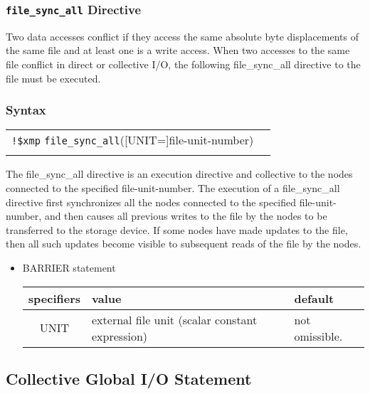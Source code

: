    \subsubsection{{\tt file\_sync\_all} Directive}
   Two data accesses conflict if they access the same absolute byte displacements of the same file and at least one is a write access.
   When two accesses to the same file conflict in direct or collective I/O,
   the following file\_sync\_all directive to the file must be executed.

   \subsubsection*{Syntax}

   \begin{tabular}{ll}
     \verb|!$xmp| {\tt file\_sync\_all}([UNIT=]file-unit-number) \\
      \\
   \end{tabular}

   The file\_sync\_all directive is an execution directive and
   collective to the nodes connected to the specified
   file-unit-number.
   The execution of a file\_sync\_all directive first synchronizes all
   the nodes connected to the specified file-unit-number, and then causes
   all previous writes to the file by the nodes to be transferred to
   the storage device.
   If some nodes have made updates to the file, then all such updates
   become visible to subsequent reads of the file by the nodes.

   \begin{itemize}
     \item BARRIER statement

   \begin{table}[h]
    \begin{center}
     \label{tb:globalopen}
     \begin{tabular}{|c||p{90mm}|l|}
       \hline
       specifiers & value & default \\ \hline \hline
       UNIT & external file unit (scalar constant expression)
       & not omissible. \\ \hline
     \end{tabular}
    \end{center}
   \end{table}

   \end{itemize}
\fi

   
   \subsection{Collective Global I/O Statement}

